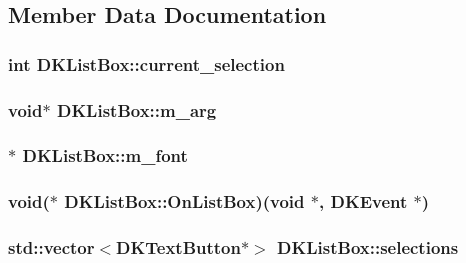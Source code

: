 \subsection{Member Data Documentation}
\hypertarget{class_d_k_list_box_a5e1637d160e99de9a037db5a2fa01e32}{
\subsubsection[{current\-\_\-selection}]{\setlength{\rightskip}{0pt plus 5cm}int D\-K\-List\-Box\-::current\-\_\-selection}}\label{class_d_k_list_box_a5e1637d160e99de9a037db5a2fa01e32}
\hypertarget{class_d_k_list_box_a12ab490712636fff3dce5bbcaf3cc129}{
\subsubsection[{m\-\_\-arg}]{\setlength{\rightskip}{0pt plus 5cm}void$\ast$ D\-K\-List\-Box\-::m\-\_\-arg}}\label{class_d_k_list_box_a12ab490712636fff3dce5bbcaf3cc129}
\hypertarget{class_d_k_list_box_a202a56d1285c4c8a54972d174aa06433}{
\subsubsection[{m\-\_\-font}]{$\ast$ D\-K\-List\-Box\-::m\-\_\-font}}\label{class_d_k_list_box_a202a56d1285c4c8a54972d174aa06433}
\hypertarget{class_d_k_list_box_ae6665f42ad516fa0ce5471136a5be0ac}{
\subsubsection[{On\-List\-Box}]{\setlength{\rightskip}{0pt plus 5cm}void($\ast$ D\-K\-List\-Box\-::\-On\-List\-Box)(void $\ast$, {\bf D\-K\-Event} $\ast$)}}\label{class_d_k_list_box_ae6665f42ad516fa0ce5471136a5be0ac}
\hypertarget{class_d_k_list_box_a913eb79de209938ce6ee29ce84112971}{
\subsubsection[{selections}]{\setlength{\rightskip}{0pt plus 5cm}std\-::vector$<${\bf D\-K\-Text\-Button}$\ast$$>$ D\-K\-List\-Box\-::selections}}\label{class_d_k_list_box_a913eb79de209938ce6ee29ce84112971}
